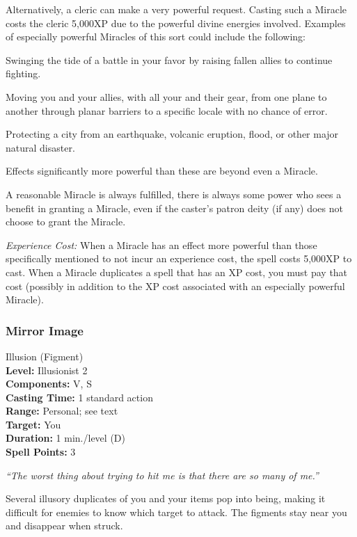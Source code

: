 Alternatively, a cleric can make a very powerful request. 
Casting such a Miracle costs the cleric 5,000XP due to the powerful divine energies involved. 
Examples of especially powerful Miracles of this sort could include the following:
\begin{list}{}{\leftmargin=1em}
  \item Swinging the tide of a battle in your favor by raising fallen allies to continue fighting.
  \item Moving you and your allies, with all your and their gear, from one plane to another through planar barriers to a specific locale with no chance of error.
  \item Protecting a city from an earthquake, volcanic eruption, flood, or other major natural disaster.
\end{list}
Effects significantly more powerful than these are beyond even a Miracle.

A reasonable Miracle is always fulfilled, there is always some power who sees a benefit in granting a Miracle,
even if the caster's patron deity (if any) does not choose to grant the Miracle.

\emph{Experience Cost:} 
When a Miracle has an effect more powerful than those specifically mentioned to not incur an experience cost, the spell costs 5,000XP to cast.
When a Miracle duplicates a spell that has an XP cost, you must pay that cost (possibly in addition to the XP cost associated with an especially powerful Miracle).
\subsubsection{Mirror Image}
\label{Spell:MirrorImage}
Illusion (Figment)
\\ \textbf{Level:} Illusionist 2
\\ \textbf{Components:} V, S
\\ \textbf{Casting Time:} 1 standard action
\\ \textbf{Range:} Personal; see text
\\ \textbf{Target:} You
\\ \textbf{Duration:} 1 min./level (D)
\\ \textbf{Spell Points:} 3

\emph{``The worst thing about trying to hit me is that there are so many of me.''}

Several illusory duplicates of you and your items pop into being, making it difficult for enemies to know which target to attack. 
The figments stay near you and disappear when struck.

